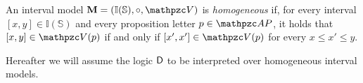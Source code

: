 \begin{definition}\label{def:homogeneous_models}
An interval model
$\bM=(\mathbb{I(S)},\circ,\cV)$ is \emph{homogeneous} if,
for every interval $[x,y]  \in \mathbb{I(S)}$ and every proposition letter $p \in \AP$,
it holds that $[x,y] \in \cV(p)$ if and only if $[x',x'] \in \cV(p)$
for every $x\leq x'\leq y$.
\end{definition}
% 
Hereafter we will assume the logic $\mathsf{D}$ to be interpreted over homogeneous interval models.
